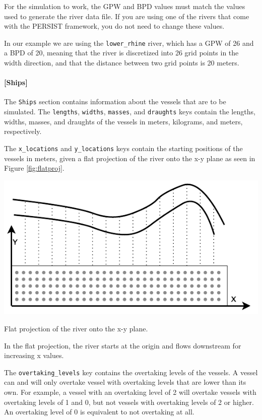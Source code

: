\documentclass[
	a4paper, %
	12pt, %
]{persist}
\begin{document}
\begin{note}
	For the simulation to work, the GPW and BPD values must match the values used to generate the river data file. If you are using one of the rivers that come with the PERSIST framework, you do not need to change these values.
\end{note}

In our example we are using the \verb|lower_rhine| river, which has a GPW of 26 and a BPD of 20, meaning that the river is discretized into 26 grid points in the width direction, and that the distance between two grid points is 20 meters.

\paragraph{[Ships]}

The \verb|Ships| section contains information about the vessels that are to be simulated. The \verb|lengths|, \verb|widths|, \verb|masses|, and \verb|draughts| keys contain the lengths, widths, masses, and draughts of the vessels in meters, kilograms, and meters, respectively. 


The \verb|x_locations| and \verb|y_locations| keys contain the starting positions of the vessels in meters, given a flat projection of the river onto the x-y plane as seen in Figure \ref{fig:flatproj}.
\begin{marginfigure}
	\includegraphics[width=\linewidth]{img/flatproj.pdf}
	\caption{Flat projection of the river onto the x-y plane.}
	\label{fig:flatproj}
\end{marginfigure}
In the flat projection, the river starts at the origin and flows downstream for increasing x values.


The \verb|overtaking_levels| key contains the overtaking levels of the vessels. A vessel can and will only overtake vessel with overtaking levels that are lower than its own. For example, a vessel with an overtaking level of 2 will overtake vessels with overtaking levels of 1 and 0, but not vessels with overtaking levels of 2 or higher. An overtaking level of 0 is equivalent to not overtaking at all.
\end{document}
